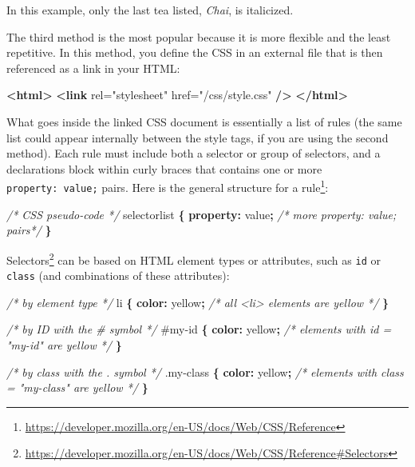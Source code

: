 \documentclass[12pt,]{krantz}
\makeatletter
\newenvironment{Shaded}{\begin{snugshade}}{\end{snugshade}}
\newcommand{\KeywordTok}[1]{\textcolor[rgb]{0.13,0.29,0.53}{\textbf{#1}}}
\newcommand{\DataTypeTok}[1]{\textcolor[rgb]{0.13,0.29,0.53}{#1}}
\newcommand{\FloatTok}[1]{\textcolor[rgb]{0.00,0.00,0.81}{#1}}
\newcommand{\StringTok}[1]{\textcolor[rgb]{0.31,0.60,0.02}{#1}}
\newcommand{\CommentTok}[1]{\textcolor[rgb]{0.56,0.35,0.01}{\textit{#1}}}
\newcommand{\OtherTok}[1]{\textcolor[rgb]{0.56,0.35,0.01}{#1}}
\newcommand{\NormalTok}[1]{#1}
\renewcommand{\href}[2]{#2\footnote{\url{#1}}}
\newenvironment{kframe}{%
\medskip{}
\setlength{\fboxsep}{.8em}
 \def\at@end@of@kframe{}%
 \ifinner\ifhmode%
  \def\at@end@of@kframe{\end{minipage}}%
  \begin{minipage}{\columnwidth}%
 \fi\fi%
 \def\FrameCommand##1{\hskip\@totalleftmargin \hskip-\fboxsep
 \colorbox{shadecolor}{##1}\hskip-\fboxsep
     \hskip-\linewidth \hskip-\@totalleftmargin \hskip\columnwidth}%
 \MakeFramed {\advance\hsize-\width
   \@totalleftmargin\z@ \linewidth\hsize
   \@setminipage}}%
 {\par\unskip\endMakeFramed%
 \at@end@of@kframe}
\renewenvironment{Shaded}{\begin{kframe}}{\end{kframe}}
\theoremstyle{definition}
\theoremstyle{definition}
\theoremstyle{definition}
\theoremstyle{remark}
\makeatother
\begin{document}
In this example, only the last tea listed, \emph{Chai}, is italicized.

The third method is the most popular because it is more flexible and the
least repetitive. In this method, you define the CSS in an external file
that is then referenced as a link in your HTML:

\begin{Shaded}
\begin{Highlighting}[]
\KeywordTok{<html>}
    \KeywordTok{<link}\OtherTok{ rel=}\StringTok{"stylesheet"}\OtherTok{ href=}\StringTok{"/css/style.css"} \KeywordTok{/>}
\KeywordTok{</html>}
\end{Highlighting}
\end{Shaded}

What goes inside the linked CSS document is essentially a list of rules
(the same list could appear internally between the style tags, if you
are using the second method). Each rule must include both a selector or
group of selectors, and a declarations block within curly braces that
contains one or more \texttt{property:\ value;} pairs. Here is the
\href{https://developer.mozilla.org/en-US/docs/Web/CSS/Reference}{general
structure for a rule}:

\begin{Shaded}
\begin{Highlighting}[]
\CommentTok{/* CSS pseudo-code */}
\NormalTok{selectorlist }\KeywordTok{\{}
    \KeywordTok{property:}\NormalTok{ value}\KeywordTok{;}
    \CommentTok{/* more property: value; pairs*/}
\KeywordTok{\}}
\end{Highlighting}
\end{Shaded}

\href{https://developer.mozilla.org/en-US/docs/Web/CSS/Reference\#Selectors}{Selectors}
can be based on HTML element types or attributes, such as \texttt{id} or
\texttt{class} (and combinations of these attributes):

\begin{Shaded}
\begin{Highlighting}[]
\CommentTok{/* by element type */}
\NormalTok{li }\KeywordTok{\{} 
    \KeywordTok{color:} \DataTypeTok{yellow}\KeywordTok{;} \CommentTok{/* all <li> elements are yellow */}
\KeywordTok{\}}

\CommentTok{/* by ID with the # symbol */}
\FloatTok{#my-id} \KeywordTok{\{} 
    \KeywordTok{color:} \DataTypeTok{yellow}\KeywordTok{;} \CommentTok{/* elements with id = "my-id" are yellow */}
\KeywordTok{\}}

\CommentTok{/* by class with the . symbol */}
\FloatTok{.my-class} \KeywordTok{\{} 
    \KeywordTok{color:} \DataTypeTok{yellow}\KeywordTok{;} \CommentTok{/* elements with class = "my-class" are yellow  */}
\KeywordTok{\}}
\end{Highlighting}
\end{Shaded}
\end{document}
